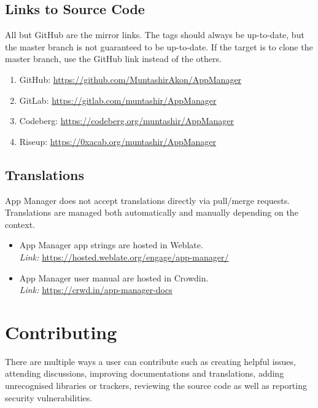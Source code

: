 \subsection{Links to Source Code}\label{subsec:links-to-source-code} %
All but GitHub are the mirror links. The tags should always be up-to-date, but the master branch is not guaranteed to be
up-to-date. If the target is to clone the master branch, use the GitHub link instead of the others.
\begin{enumerate}
    \item GitHub: \url{https://github.com/MuntashirAkon/AppManager}
    \item GitLab: \url{https://gitlab.com/muntashir/AppManager}
    \item Codeberg: \url{https://codeberg.org/muntashir/AppManager}
    \item Riseup: \url{https://0xacab.org/muntashir/AppManager}
\end{enumerate}

\subsection{Translations}\label{subsec:translations} %
App Manager does not accept translations directly via pull/merge requests. Translations are managed both automatically
and manually depending on the context.
\begin{itemize}
    \item App Manager app strings are hosted in Weblate.\\
    \textit{Link:} \url{https://hosted.weblate.org/engage/app-manager/}
    \item App Manager user manual are hosted in Crowdin.\\
    \textit{Link:} \url{https://crwd.in/app-manager-docs}
\end{itemize}

\section{Contributing}\label{sec:contributing} %
There are multiple ways a user can contribute such as creating helpful issues, attending discussions, improving
documentations and translations, adding unrecognised libraries or trackers, reviewing the source code as well as
reporting security vulnerabilities.

